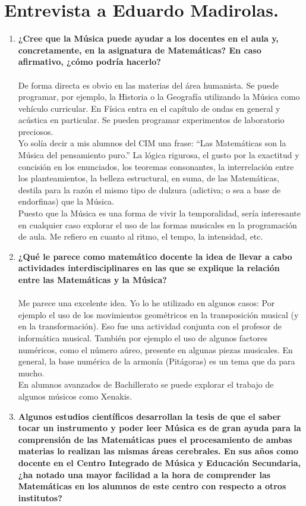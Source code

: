 \documentclass[a4paper, openright, 11pt, titlepage]{report}
\theoremstyle{definition}\newtheorem{defin}[propo]{Definition}
\theoremstyle{definition}\newtheorem{obser}[propo]{Remark}
\theoremstyle{definition}\newtheorem{ejem}[propo]{Ejemplo}
\theoremstyle{definition}\newtheorem{algoritmo}[propo]{Algoritmo}
\begin{document}
\section{Entrevista a Eduardo Madirolas.}
\begin{enumerate}
    \item \textbf{¿Cree que la Música puede ayudar a los docentes en el aula y, concretamente, en la asignatura de Matemáticas? En caso afirmativo, ¿cómo podría hacerlo?}\\\\
    De forma directa es obvio en las materias del área humanista. Se puede programar, por ejemplo, la Historia o la Geografía utilizando la Música como vehículo curricular. En Física entra en el capítulo de ondas en general y acústica en particular. Se pueden programar experimentos de laboratorio preciosos.\\
    Yo solía decir a mis alumnos del CIM una frase: “Las Matemáticas son la Música del pensamiento puro.” La lógica rigurosa, el gusto por la exactitud y concisión en los enunciados, los teoremas consonantes, la interrelación entre los planteamientos, la belleza estructural, en suma, de las Matemáticas, destila para la razón el mismo tipo de
    dulzura (adictiva; o sea a base de endorfinas) que la Música.\\
    Puesto que la Música es una forma de vivir la temporalidad, sería interesante en cualquier caso explorar el uso de las formas musicales en la programación de aula. Me refiero en cuanto al ritmo, el tempo, la intensidad, etc.
    \item \textbf{¿Qué le parece como matemático docente la idea de llevar a cabo actividades interdisciplinares en las que se explique la relación entre las Matemáticas y la Música?}\\\\
    Me parece una excelente idea. Yo lo he utilizado en algunos casos: Por ejemplo el uso de los movimientos geométricos en la transposición musical (y en la transformación). Eso fue una actividad conjunta con el profesor de informática musical. También por ejemplo el uso de algunos factores numéricos, como el número aúreo, presente en algunas piezas musicales. En general, la base numérica de la armonía (Pitágoras) es un tema que da para mucho. \\
    En alumnos avanzados de Bachillerato se puede explorar el trabajo de algunos músicos como Xenakis.
    \item \textbf{Algunos estudios científicos desarrollan la tesis de que el saber tocar un instrumento y poder leer Música es de gran ayuda para la comprensión de las Matemáticas pues el procesamiento de ambas materias lo realizan las mismas áreas cerebrales. En sus años como docente en el Centro Integrado de Música y Educación Secundaria, ¿ha notado una mayor facilidad a la hora de comprender las Matemáticas en los alumnos de este centro con respecto a otros institutos?}\\\\

\end{enumerate}
\end{document}
